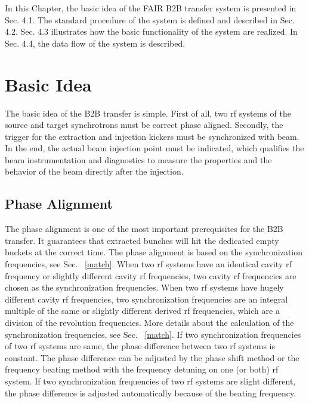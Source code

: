 

In this Chapter, the basic idea of the FAIR B2B transfer system is presented in Sec. 4.1. The standard procedure of the system is defined and described in Sec. 4.2. Sec. 4.3 illustrates how the basic functionality of the system are realized. In Sec. 4.4, the data flow of the system is described. 

\section{Basic Idea} 
The basic idea of the B2B transfer is simple. First of all, two rf systems of the source and target synchrotrons must be correct phase aligned. Secondly, the trigger for the extraction and injection kickers must be synchronized with beam. In the end, the actual beam injection point must be indicated, which
qualifies the beam instrumentation and diagnostics to measure the properties and the behavior of the beam directly after the injection. 



\subsection{Phase Alignment}
The phase alignment is one of the most important prerequisites for the B2B transfer. It guarantees that extracted bunches will hit the dedicated empty buckets at the correct time. The phase alignment is based on the synchronization frequencies, see Sec. ~\ref{match}. When two rf systems have an identical cavity rf frequency or slightly different cavity rf frequencies, two cavity rf frequencies are chosen as the synchronization frequencies. When two rf systems have hugely different cavity rf frequencies, two synchronization frequencies are an integral multiple of the same or slightly different derived rf frequencies, which are a division of the revolution frequencies. More details about the calculation of the synchronization frequencies, see Sec. ~\ref{match}. If two synchronization frequencies of two rf systems are same, the phase difference between two rf systems is constant. The phase difference can be adjusted by the phase shift method or the frequency beating method with the frequency detuning on one (or both) rf system. If two synchronization frequencies of two rf systems are slight different, the phase difference is adjusted automatically because of the beating frequency. %

